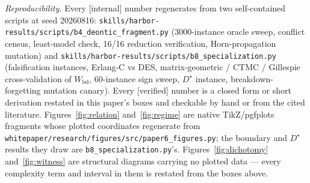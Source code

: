\documentclass[11pt,a4paper]{article}
\begin{document}
\vspace{0.4em} \noindent\emph{Reproducibility.} Every [internal] number regenerates from two self-contained scripts at seed
20260816: \texttt{skills/harbor-results/scripts/b4\_deontic\_fragment.py} (3000-instance oracle sweep, conflict census,
least-model check, 16/16 reduction verification, Horn-propagation mutation) and
\texttt{skills/harbor-results/scripts/b8\_specialization.py} (falsification instances, Erlang-C vs DES, matrix-geometric /
CTMC / Gillespie cross-validation of $W_{\mathrm{bd}}$, 60-instance sign sweep, $D^\star$ instance, breakdown-forgetting
mutation canary). Every [verified] number is a closed form or short derivation restated in this paper's boxes and checkable by
hand or from the cited literature. Figures~\ref{fig:relation} and~\ref{fig:regime} are native TikZ/pgfplots fragments whose
plotted coordinates regenerate from \texttt{whitepaper/research/figures/src/paper6\_figures.py}; the boundary and $D^\star$
results they draw are \texttt{b8\_specialization.py}'s. Figures~\ref{fig:dichotomy} and~\ref{fig:witness} are structural
diagrams carrying no plotted data --- every complexity term and interval in them is restated from the boxes above.
\end{document}
